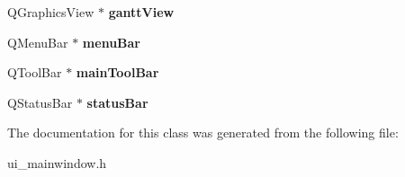 \begin{DoxyCompactItemize}
\item 
\hypertarget{class_ui___main_window_a43a3a453d89302e0ba6101a82aacb1d0}{}Q\+Graphics\+View $\ast$ {\bfseries gantt\+View}\label{class_ui___main_window_a43a3a453d89302e0ba6101a82aacb1d0}

\item 
\hypertarget{class_ui___main_window_a2be1c24ec9adfca18e1dcc951931457f}{}Q\+Menu\+Bar $\ast$ {\bfseries menu\+Bar}\label{class_ui___main_window_a2be1c24ec9adfca18e1dcc951931457f}

\item 
\hypertarget{class_ui___main_window_a5172877001c8c7b4e0f6de50421867d1}{}Q\+Tool\+Bar $\ast$ {\bfseries main\+Tool\+Bar}\label{class_ui___main_window_a5172877001c8c7b4e0f6de50421867d1}

\item 
\hypertarget{class_ui___main_window_a50fa481337604bcc8bf68de18ab16ecd}{}Q\+Status\+Bar $\ast$ {\bfseries status\+Bar}\label{class_ui___main_window_a50fa481337604bcc8bf68de18ab16ecd}

\end{DoxyCompactItemize}


The documentation for this class was generated from the following file\+:\begin{DoxyCompactItemize}
\item 
ui\+\_\+mainwindow.\+h\end{DoxyCompactItemize}
